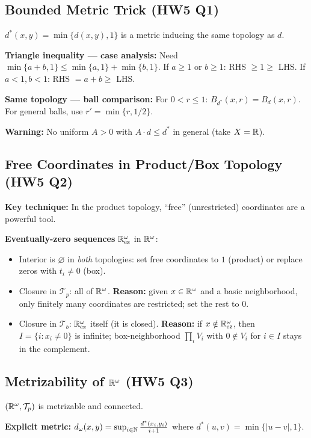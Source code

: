 \documentclass{article}
\begin{document}
\subsection{Bounded Metric Trick (HW5 Q1)}
\begin{proposition}
  $d^*(x,y) = \min\{d(x,y), 1\}$ is a metric inducing the same topology as $d$.
\end{proposition}
\textbf{Triangle inequality --- case analysis:} Need $\min\{a+b, 1\}
\le \min\{a,1\} + \min\{b,1\}$.
If $a \ge 1$ or $b \ge 1$: RHS $\ge 1 \ge$ LHS. If $a < 1, b < 1$:
RHS $= a+b \ge$ LHS.

\textbf{Same topology --- ball comparison:} For $0 < r \le 1$:
$B_{d^*}(x,r) = B_d(x,r)$. For general balls, use $r' = \min\{r, 1/2\}$.

\textbf{Warning:} No uniform $A > 0$ with $A \cdot d \le d^*$ in
general (take $X = \mathbb{R}$).

\subsection{Free Coordinates in Product/Box Topology (HW5 Q2)}
\textbf{Key technique:} In the product topology, ``free''
(unrestricted) coordinates are a powerful tool.

\textbf{Eventually-zero sequences} $\mathbb{R}^\omega_{\mathrm{ez}}$ in $\mathbb{R}^\omega$:
\begin{itemize}
  \item Interior is $\varnothing$ in \emph{both} topologies: set free
    coordinates to $1$ (product) or replace zeros with $t_i \ne 0$ (box).
  \item Closure in $\mathcal{T}_p$: all of $\mathbb{R}^\omega$.
    \textbf{Reason:} given $x \in \mathbb{R}^\omega$ and a basic
    neighborhood, only finitely many coordinates are restricted; set
    the rest to $0$.
  \item Closure in $\mathcal{T}_b$: $\mathbb{R}^\omega_{\mathrm{ez}}$ itself
    (it is closed). \textbf{Reason:} if $x \notin
    \mathbb{R}^\omega_{\mathrm{ez}}$, then $I = \{i : x_i \ne 0\}$ is
    infinite; box-neighborhood $\prod_i V_i$ with $0 \notin V_i$ for
    $i \in I$ stays in the complement.
\end{itemize}

\subsection{Metrizability of $\mathbb{R}^\omega$ (HW5 Q3)}
\begin{theorem}
  $(\mathbb{R}^\omega, \mathcal{T}_p)$ is metrizable and connected.
\end{theorem}
\textbf{Explicit metric:} $d_\omega(x,y) = \sup_{i \in \mathbb{N}}
\frac{d^*(x_i, y_i)}{i+1}$ where $d^*(u,v) = \min\{|u-v|, 1\}$.
\end{document}
